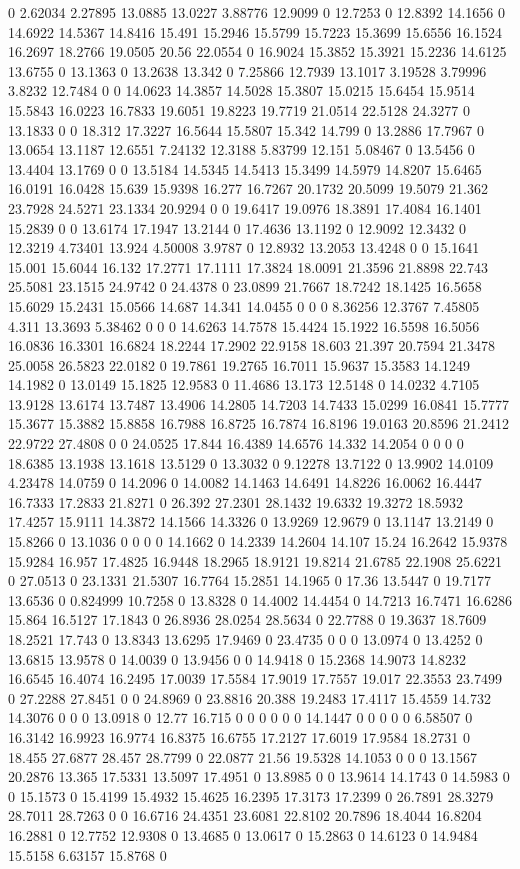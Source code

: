 0 2.62034 2.27895 13.0885 13.0227 3.88776 12.9099 0 12.7253 0 12.8392 14.1656 0 14.6922 14.5367 14.8416 15.491 15.2946 15.5799 15.7223 15.3699 15.6556 16.1524 16.2697 18.2766 19.0505 20.56 22.0554 0 16.9024 15.3852 15.3921 15.2236 14.6125 13.6755 0 13.1363 0 13.2638 13.342 0 7.25866 12.7939 13.1017 3.19528 3.79996 3.8232 12.7484 0 0 14.0623 14.3857 14.5028 15.3807 15.0215 15.6454 15.9514 15.5843 16.0223 16.7833 19.6051 19.8223 19.7719 21.0514 22.5128 24.3277 0 13.1833 0 0 18.312 17.3227 16.5644 15.5807 15.342 14.799 0 13.2886 17.7967 0 13.0654 13.1187 12.6551 7.24132 12.3188 5.83799 12.151 5.08467 0 13.5456 0 13.4404 13.1769 0 0 13.5184 14.5345 14.5413 15.3499 14.5979 14.8207 15.6465 16.0191 16.0428 15.639 15.9398 16.277 16.7267 20.1732 20.5099 19.5079 21.362 23.7928 24.5271 23.1334 20.9294 0 0 19.6417 19.0976 18.3891 17.4084 16.1401 15.2839 0 0 13.6174 17.1947 13.2144 0 17.4636 13.1192 0 12.9092 12.3432 0 12.3219 4.73401 13.924 4.50008 3.9787 0 12.8932 13.2053 13.4248 0 0 15.1641 15.001 15.6044 16.132 17.2771 17.1111 17.3824 18.0091 21.3596 21.8898 22.743 25.5081 23.1515 24.9742 0 24.4378 0 23.0899 21.7667 18.7242 18.1425 16.5658 15.6029 15.2431 15.0566 14.687 14.341 14.0455 0 0 0 8.36256 12.3767 7.45805 4.311 13.3693 5.38462 0 0 0 14.6263 14.7578 15.4424 15.1922 16.5598 16.5056 16.0836 16.3301 16.6824 18.2244 17.2902 22.9158 18.603 21.397 20.7594 21.3478 25.0058 26.5823 22.0182 0 19.7861 19.2765 16.7011 15.9637 15.3583 14.1249 14.1982 0 13.0149 15.1825 12.9583 0 11.4686 13.173 12.5148 0 14.0232 4.7105 13.9128 13.6174 13.7487 13.4906 14.2805 14.7203 14.7433 15.0299 16.0841 15.7777 15.3677 15.3882 15.8858 16.7988 16.8725 16.7874 16.8196 19.0163 20.8596 21.2412 22.9722 27.4808 0 0 24.0525 17.844 16.4389 14.6576 14.332 14.2054 0 0 0 0 18.6385 13.1938 13.1618 13.5129 0 13.3032 0 9.12278 13.7122 0 13.9902 14.0109 4.23478 14.0759 0 14.2096 0 14.0082 14.1463 14.6491 14.8226 16.0062 16.4447 16.7333 17.2833 21.8271 0 26.392 27.2301 28.1432 19.6332 19.3272 18.5932 17.4257 15.9111 14.3872 14.1566 14.3326 0 13.9269 12.9679 0 13.1147 13.2149 0 15.8266 0 13.1036 0 0 0 0 14.1662 0 14.2339 14.2604 14.107 15.24 16.2642 15.9378 15.9284 16.957 17.4825 16.9448 18.2965 18.9121 19.8214 21.6785 22.1908 25.6221 0 27.0513 0 23.1331 21.5307 16.7764 15.2851 14.1965 0 17.36 13.5447 0 19.7177 13.6536 0 0.824999 10.7258 0 13.8328 0 14.4002 14.4454 0 14.7213 16.7471 16.6286 15.864 16.5127 17.1843 0 26.8936 28.0254 28.5634 0 22.7788 0 19.3637 18.7609 18.2521 17.743 0 13.8343 13.6295 17.9469 0 23.4735 0 0 0 13.0974 0 13.4252 0 13.6815 13.9578 0 14.0039 0 13.9456 0 0 14.9418 0 15.2368 14.9073 14.8232 16.6545 16.4074 16.2495 17.0039 17.5584 17.9019 17.7557 19.017 22.3553 23.7499 0 27.2288 27.8451 0 0 24.8969 0 23.8816 20.388 19.2483 17.4117 15.4559 14.732 14.3076 0 0 0 13.0918 0 12.77 16.715 0 0 0 0 0 0 14.1447 0 0 0 0 0 6.58507 0 16.3142 16.9923 16.9774 16.8375 16.6755 17.2127 17.6019 17.9584 18.2731 0 18.455 27.6877 28.457 28.7799 0 22.0877 21.56 19.5328 14.1053 0 0 0 13.1567 20.2876 13.365 17.5331 13.5097 17.4951 0 13.8985 0 0 13.9614 14.1743 0 14.5983 0 0 15.1573 0 15.4199 15.4932 15.4625 16.2395 17.3173 17.2399 0 26.7891 28.3279 28.7011 28.7263 0 0 16.6716 24.4351 23.6081 22.8102 20.7896 18.4044 16.8204 16.2881 0 12.7752 12.9308 0 13.4685 0 13.0617 0 15.2863 0 14.6123 0 14.9484 15.5158 6.63157 15.8768 0 